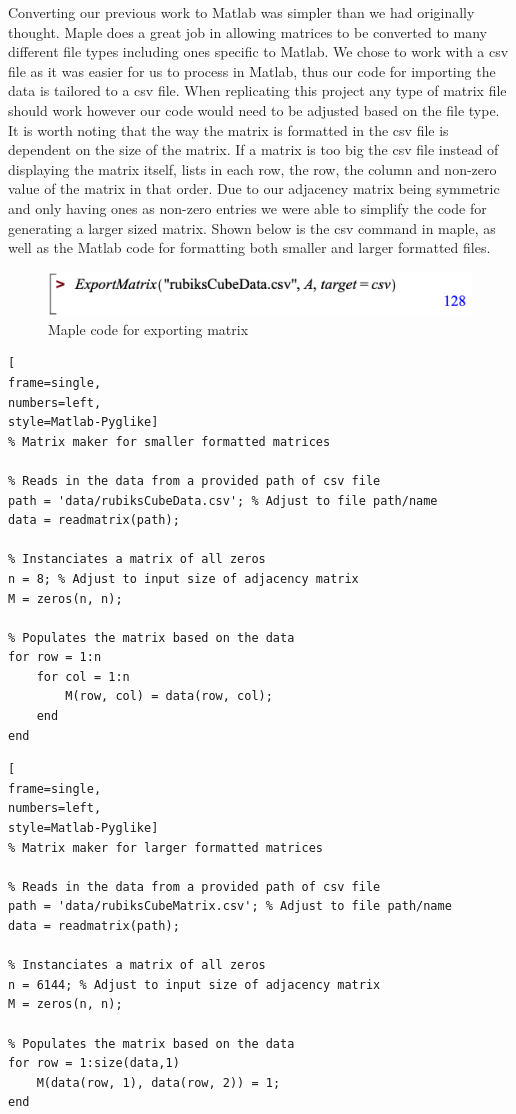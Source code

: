 \documentclass{article}
\begin{document}
Converting our previous work to Matlab was simpler than we had originally thought.  Maple does a great job in allowing matrices to be converted to many different file types including ones specific to Matlab.  We chose to work with a csv file as it was easier for us to process in Matlab, thus our code for importing the data is tailored to a csv file.  When replicating this project any type of matrix file should work however our code would need to be adjusted based on the file type. It is worth noting that the way the matrix is formatted in the csv file is dependent on the size of the matrix.  If a matrix is too big the csv file instead of displaying the matrix itself, lists in each row, the row, the column and non-zero value of the matrix in that order.  Due to our adjacency matrix being symmetric and only having ones as non-zero entries we were able to simplify the code for generating a larger sized matrix.  Shown below is the csv command in maple, as well as the Matlab code for formatting both smaller and larger formatted files.
\begin{figure}[ht]
    \centering
        \includegraphics[scale=0.6]{images/ExportingMatrix.png}
        \caption{Maple code for exporting matrix}
\end{figure}
\begin{lstlisting}[
frame=single,
numbers=left,
style=Matlab-Pyglike]
% Matrix maker for smaller formatted matrices

% Reads in the data from a provided path of csv file 
path = 'data/rubiksCubeData.csv'; % Adjust to file path/name
data = readmatrix(path);

% Instanciates a matrix of all zeros
n = 8; % Adjust to input size of adjacency matrix
M = zeros(n, n);

% Populates the matrix based on the data
for row = 1:n
    for col = 1:n
        M(row, col) = data(row, col);
    end
end
\end{lstlisting}
\begin{lstlisting}[
frame=single,
numbers=left,
style=Matlab-Pyglike]
% Matrix maker for larger formatted matrices

% Reads in the data from a provided path of csv file 
path = 'data/rubiksCubeMatrix.csv'; % Adjust to file path/name
data = readmatrix(path);

% Instanciates a matrix of all zeros
n = 6144; % Adjust to input size of adjacency matrix
M = zeros(n, n);

% Populates the matrix based on the data
for row = 1:size(data,1)
    M(data(row, 1), data(row, 2)) = 1;
end
\end{lstlisting}
\end{document}
